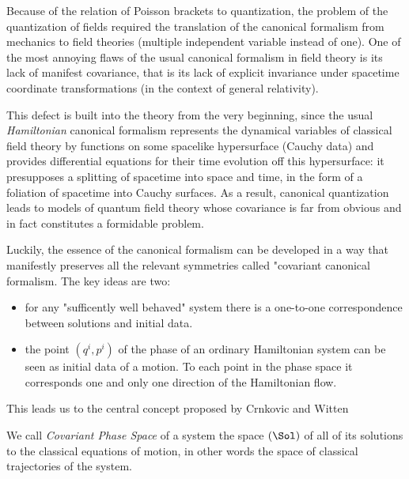 \documentclass[Main]{subfiles}
\begin{document}
		Because of the relation of Poisson brackets to quantization, the problem of the quantization of fields required the translation of the canonical formalism from mechanics to field theories (multiple independent variable instead of one).
		One of the most annoying flaws of the usual canonical formalism in field theory is its lack of manifest covariance, that is its lack of explicit invariance under spacetime coordinate transformations (in the context of general relativity). 
			
			This defect is built into the theory from the very beginning, since the usual \emph{Hamiltonian} canonical formalism represents the dynamical variables of classical field theory by functions on some spacelike hypersurface (Cauchy data) and provides differential equations for their time evolution off this hypersurface: 
			it presupposes a splitting of spacetime into space and time, in the form of a foliation of spacetime into Cauchy surfaces.	
			As a result, canonical quantization leads to models of quantum field theory whose covariance is far from obvious and in fact constitutes a formidable problem.
		
		Luckily, the essence of the canonical formalism can be developed in a way that manifestly preserves all the relevant symmetries called "covariant canonical formalism.
		The key ideas are two:
		\begin{itemize}
			\item  for any "sufficently well behaved" system there is a one-to-one correspondence between solutions and initial data.
			\item the point $(q^i,p^i)$ of the phase of an ordinary Hamiltonian system can be seen as initial data of a motion.
						To each point in the phase space it corresponds one and only one direction of the Hamiltonian flow.
		\end{itemize}
		This leads us to the central concept proposed by Crnkovic and Witten\cite{Crnkovic1999}
		
		\begin{definition}
			We call \emph{Covariant Phase Space} of a system the space $( \Sol )$ of all of its solutions to the classical equations of motion,
			in other words the space of classical trajectories of the system. 
		\end{definition}
		
\end{document}
